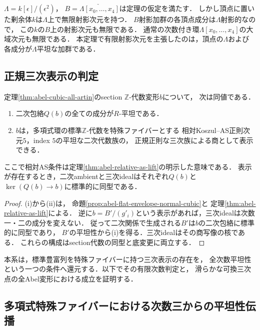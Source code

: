 \begin{remark}[絶対的大域次元は持ち上がらない]
\label{rem:abel-relative-not-absolute-gldim}
$\Lambda=k[\epsilon]/(\epsilon^2)$，
$B=\check{\Lambda[x_0,\ldots,x_4]}$は定理の仮定を満たす．
しかし頂点に置いた剰余体$k$は$\Lambda$上で無限射影次元を持つ．
$B$射影加群の各頂点成分は$\Lambda$射影的なので，
この$k$の$B$上の射影次元も無限である．
通常の次数付き環$\Lambda[x_0,\ldots,x_4]$の大域次元も無限である．
本定理で有限射影次元を主張したのは，頂点の$\Lambda$および
各成分が$\Lambda$平坦な加群である．
\end{remark}


\subsection{正規三次表示の判定}
\begin{corollary}[正規三次表示の平坦二次包絡判定]
\label{cor:abel-cubic-flatness-criterion}
定理\ref{thm:abel-cubic-all-artin}のsection $\mathbb Z$-代数変形$b$について，
次は同値である．
\begin{enumerate}[label=\textup{(\roman*)}]
\item 二次包絡$Q(b)$の全ての成分が$R$-平坦である．
\item $b$は，多項式環の標準$\mathbb Z$-代数を特殊ファイバーとする
相対Koszul--AS正則次元$5$，index $5$の平坦な二次代数族の，
正規正則な三次族による商として表示できる．
\end{enumerate}
ここで相対AS条件は定理\ref{thm:abel-relative-as-lift}の明示した意味である．
表示が存在するとき，二次ambientと三次idealはそれぞれ$Q(b)$と
$\ker(Q(b)\to b)$に標準的に同型である．
\end{corollary}
\begin{proof}
\textup{(i)}から\textup{(ii)}は，
命題\ref{prop:abel-flat-envelope-normal-cubic}と
定理\ref{thm:abel-relative-as-lift}による．
逆に$b=B'/(g'_i)$という表示があれば，三次idealは次数一・二の成分を変えない．
従って二次関係で生成される$B'$は$b$の二次包絡に標準的に同型であり，
$B'$の平坦性から\textup{(i)}を得る．三次idealはその商写像の核である．
これらの構成はsection代数の同型と底変更に両立する．
\end{proof}

本系は，標準豊富列を特殊ファイバーに持つ三次表示の存在を，
全次数平坦性という一つの条件へ還元する．以下でその有限次数判定と，
滑らかな可換三次点の全Abel変形における成立を証明する．


\subsection{多項式特殊ファイバーにおける次数三からの平坦性伝播}
\label{subsec:abel-degree-three-propagation}

